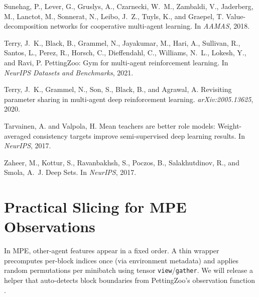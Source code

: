 \documentclass[nohyperref]{article}
\begin{document}
\begin{thebibliography}{}
Sunehag, P., Lever, G., Gruslys, A., Czarnecki, W.~M., Zambaldi, V., Jaderberg, M., Lanctot, M., Sonnerat, N., Leibo, J.~Z., Tuyls, K., and Graepel, T.
\newblock Value-decomposition networks for cooperative multi-agent learning.
\newblock In \emph{AAMAS}, 2018.

Terry, J.~K., Black, B., Grammel, N., Jayakumar, M., Hari, A., Sullivan, R., Santos, L., Perez, R., Horsch, C., Dieffendahl, C., Williams, N.~L., Lokesh, Y., and Ravi, P.
\newblock PettingZoo: Gym for multi-agent reinforcement learning.
\newblock In \emph{NeurIPS Datasets and Benchmarks}, 2021.

Terry, J.~K., Grammel, N., Son, S., Black, B., and Agrawal, A.
\newblock Revisiting parameter sharing in multi-agent deep reinforcement learning.
\newblock \emph{arXiv:2005.13625}, 2020.

Tarvainen, A. and Valpola, H.
\newblock Mean teachers are better role models: Weight-averaged consistency targets improve semi-supervised deep learning results.
\newblock In \emph{NeurIPS}, 2017.

Zaheer, M., Kottur, S., Ravanbakhsh, S., Poczos, B., Salakhutdinov, R., and Smola, A.~J.
\newblock Deep Sets.
\newblock In \emph{NeurIPS}, 2017.
\end{thebibliography}

\appendix
\section{Practical Slicing for MPE Observations}
In MPE, other-agent features appear in a fixed order. A thin wrapper precomputes per-block indices once (via environment metadata) and applies random permutations per minibatch using tensor \texttt{view}/\texttt{gather}. We will release a helper that auto-detects block boundaries from PettingZoo’s observation function \citep{terry2021pettingzoo}.
\end{document}
